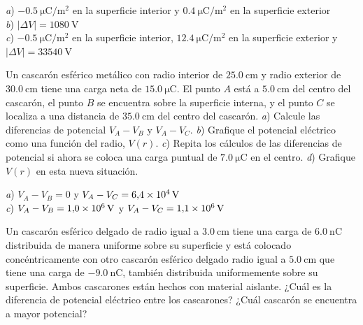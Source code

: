 \begin{Answer}
  \begin{minipage}[t]{.4\textwidth}
    \textit{a}) $\SI{-0.5}{\micro\coulomb/\metre\squared}$ en la superficie interior y $\SI{0.4}{\micro\coulomb/\metre\squared}$ en la superficie exterior\\ \textit{b}) $|\Delta V| = \SI{1080}{\volt}$\\ \textit{c}) $\SI{-0.5}{\micro\coulomb/\metre\squared}$ en la superficie interior, $\SI{12.4}{\micro\coulomb/\metre\squared}$ en la superficie exterior y $|\Delta V| = \SI{33540}{\volt}$
  \end{minipage}
\end{Answer}
%
\begin{Exercise}
  Un cascarón esférico metálico con radio interior de $\SI{25.0}{\centi\metre}$ y radio exterior de $\SI{30.0}{\centi\metre}$ tiene una carga neta de $\SI{15.0}{\micro\coulomb}$. El punto $A$ está a $\SI{5.0}{\centi\metre}$ del centro del cascarón, el punto $B$ se encuentra sobre la superficie interna, y el punto $C$ se localiza a una distancia de $\SI{35.0}{\centi\metre}$ del centro del cascarón. \textit{a}) Calcule las diferencias de potencial $V_A-V_B$ y $V_A-V_C$. \textit{b}) Grafique el potencial eléctrico como una función del radio, $V(r)$. \textit{c}) Repita los cálculos de las diferencias de potencial si ahora se coloca una carga puntual de $\SI{7.0}{\micro\coulomb}$ en el centro. \textit{d}) Grafique $V(r)$ en esta nueva situación.
\end{Exercise}
\begin{Answer}
	\begin{minipage}[t]{.4\textwidth}
    \textit{a}) $V_A-V_B = 0$ y $V_A-V_C = \SI{6.4E4}{\volt}$\\ \textit{c}) $V_A-V_B = \SI{1.0E6}{\volt}$ y $V_A-V_C = \SI{1.1E6}{\volt}$
  \end{minipage}
\end{Answer}
%
\begin{Exercise}
  Un cascarón esférico delgado de radio igual a $\SI{3.0}{\centi\metre}$ tiene una carga de $\SI{6.0}{\nano\coulomb}$ distribuida de manera uniforme sobre su superficie y está colocado concéntricamente con otro cascarón esférico delgado radio igual a $\SI{5.0}{\centi\metre}$ que tiene una carga de $\SI{-9.0}{\nano\coulomb}$, también distribuida uniformemente sobre su superficie. Ambos cascarones están hechos con material aislante. ¿Cuál es la diferencia de potencial eléctrico entre los cascarones? ¿Cuál cascarón se encuentra a mayor potencial?
\end{Exercise}

